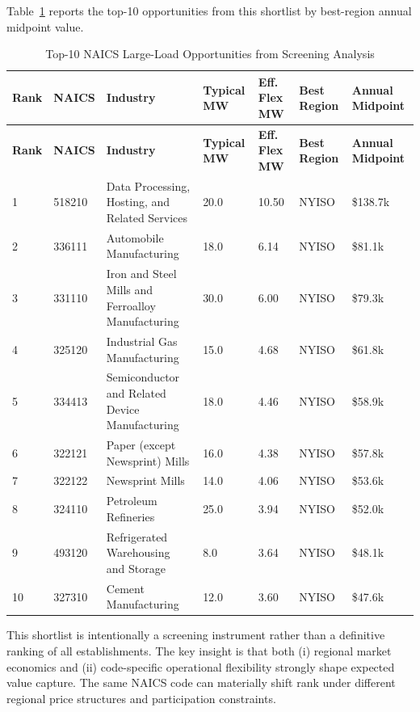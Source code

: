 \documentclass[12pt]{article}
\begin{document}
Table~\ref{tab:naics_top10} reports the top-10 opportunities from this shortlist by best-region annual midpoint value.

\begin{longtable}{p{0.9cm}p{1.6cm}p{4.8cm}p{1.8cm}p{1.8cm}p{2cm}p{2.3cm}}
\caption{Top-10 NAICS Large-Load Opportunities from Screening Analysis}\label{tab:naics_top10}\\
\toprule
\textbf{Rank} & \textbf{NAICS} & \textbf{Industry} & \textbf{Typical MW} & \textbf{Eff. Flex MW} & \textbf{Best Region} & \textbf{Annual Midpoint} \\
\midrule
\endfirsthead
\toprule
\textbf{Rank} & \textbf{NAICS} & \textbf{Industry} & \textbf{Typical MW} & \textbf{Eff. Flex MW} & \textbf{Best Region} & \textbf{Annual Midpoint} \\
\midrule
\endhead
1 & 518210 & Data Processing, Hosting, and Related Services & 20.0 & 10.50 & NYISO & \$138.7k \\
\midrule
2 & 336111 & Automobile Manufacturing & 18.0 & 6.14 & NYISO & \$81.1k \\
\midrule
3 & 331110 & Iron and Steel Mills and Ferroalloy Manufacturing & 30.0 & 6.00 & NYISO & \$79.3k \\
\midrule
4 & 325120 & Industrial Gas Manufacturing & 15.0 & 4.68 & NYISO & \$61.8k \\
\midrule
5 & 334413 & Semiconductor and Related Device Manufacturing & 18.0 & 4.46 & NYISO & \$58.9k \\
\midrule
6 & 322121 & Paper (except Newsprint) Mills & 16.0 & 4.38 & NYISO & \$57.8k \\
\midrule
7 & 322122 & Newsprint Mills & 14.0 & 4.06 & NYISO & \$53.6k \\
\midrule
8 & 324110 & Petroleum Refineries & 25.0 & 3.94 & NYISO & \$52.0k \\
\midrule
9 & 493120 & Refrigerated Warehousing and Storage & 8.0 & 3.64 & NYISO & \$48.1k \\
\midrule
10 & 327310 & Cement Manufacturing & 12.0 & 3.60 & NYISO & \$47.6k \\
\bottomrule
\end{longtable}

This shortlist is intentionally a screening instrument rather than a definitive ranking of all establishments. The key insight is that both (i) regional market economics and (ii) code-specific operational flexibility strongly shape expected value capture. The same NAICS code can materially shift rank under different regional price structures and participation constraints.
\end{document}
